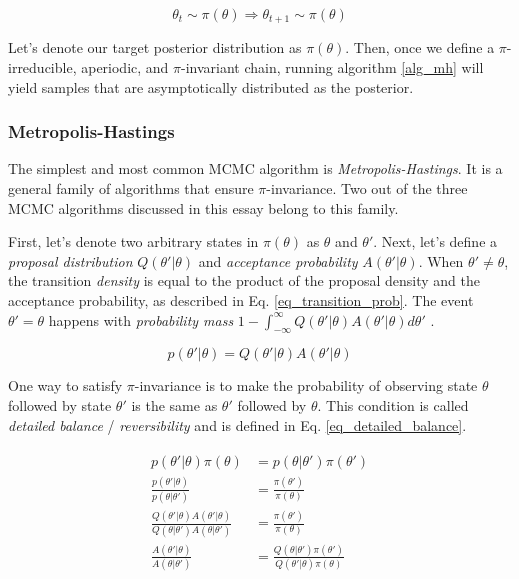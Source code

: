 \documentclass[12pt]{article}
\begin{document}
{\begin{equation}
\theta_t \sim \pi(\theta) \Rightarrow \theta_{t+1} \sim \pi(\theta)
\end{equation}

Let's denote our target posterior distribution as $\pi(\theta)$. Then, once we define a $\pi$-irreducible, aperiodic, and $\pi$-invariant chain, running algorithm \ref{alg_mh} will yield samples that are asymptotically distributed as the posterior.

\subsubsection{Metropolis-Hastings}

The simplest and most common MCMC algorithm is \textit{Metropolis-Hastings}. It is a general family of algorithms that ensure $\pi$-invariance. Two out of the three MCMC algorithms discussed in this essay belong to this family.

First, let's denote two arbitrary states in $\pi(\theta)$ as $\theta$ and $\theta'$. Next, let's define a \textit{proposal distribution} $Q(\theta'|\theta)$ and \textit{acceptance probability} $A(\theta'|\theta)$. When $\theta' \ne \theta$, the transition \textit{density} is equal to the product of the proposal density and the acceptance probability, as described in Eq. \ref{eq_transition_prob}. The event $\theta' = \theta$ happens with \textit{probability mass} $1-\int_{-\infty}^{\infty} Q(\theta'|\theta)A(\theta'|\theta) d\theta'$ .

\begin{equation}
p(\theta'|\theta) = Q(\theta'|\theta)A(\theta'|\theta)
\label{eq_transition_prob}
\end{equation}

One way to satisfy $\pi$-invariance is to make the probability of observing state $\theta$ followed by state $\theta'$ is the same as $\theta'$ followed by $\theta$. This condition is called \textit{detailed balance} / \textit{reversibility} and is defined in Eq. \ref{eq_detailed_balance}.

\begin{align}
\begin{split}
p(\theta'|\theta)\pi(\theta) &= p(\theta|\theta')\pi(\theta') \\
\frac{p(\theta'|\theta)}{p(\theta|\theta')} &= \frac{\pi(\theta')}{\pi(\theta)} \\
\frac{Q(\theta'|\theta)A(\theta'|\theta)}{Q(\theta|\theta')A(\theta|\theta')} &= \frac{\pi(\theta')}{\pi(\theta)} \\
\frac{A(\theta'|\theta)}{A(\theta|\theta')} &= \frac{Q(\theta|\theta')\pi(\theta')}{Q(\theta'|\theta)\pi(\theta)}
\label{eq_detailed_balance}
\end{split}
\end{align}

}
\end{document}
